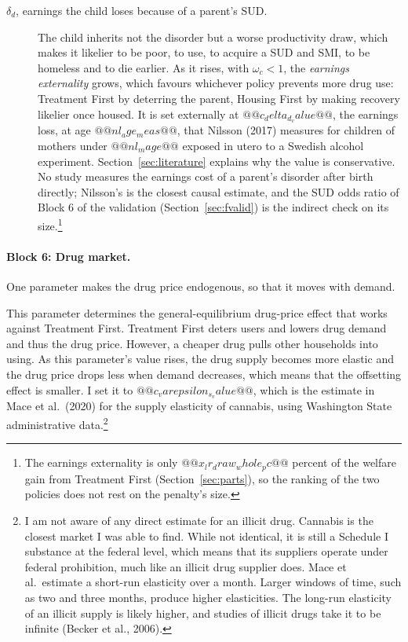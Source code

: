 \documentclass[10pt]{article}
\begin{document}
\begin{description}
\item[$\delta_d$, earnings the child loses because of a parent's SUD.] The child inherits not the disorder but a worse productivity draw, which makes it likelier to be poor, to use, to acquire a SUD and SMI, to be homeless and to die earlier. As it rises, with $\omega_c<1$, the \emph{earnings externality} grows, which favours whichever policy prevents more drug use: Treatment First by deterring the parent, Housing First by making recovery likelier once housed. It is set externally at $@@c_delta_d_value@@$, the earnings loss, at age $@@nl_age_meas@@$, that Nilsson (2017) measures for children of mothers under $@@nl_mage@@$ exposed in utero to a Swedish alcohol experiment. Section~\ref{sec:literature} explains why the value is conservative. No study measures the earnings cost of a parent's disorder after birth directly; Nilsson's is the closest causal estimate, and the SUD odds ratio of Block 6 of the validation (Section~\ref{sec:fvalid}) is the indirect check on its size.\footnote{The earnings externality is only $@@x_lr_draw_whole_pc@@$ percent of the welfare gain from Treatment First (Section~\ref{sec:parts}), so the ranking of the two policies does not rest on the penalty's size.}
\end{description}

\paragraph{Block 6: Drug market.} One parameter makes the drug price endogenous, so that it moves with demand.
\begin{description}\setlength{\itemsep}{0.25em}\setlength{\parskip}{0em}
\item[$\varepsilon_s$, the price elasticity of drug supply.]   This parameter determines the general-equilibrium drug-price effect that works against Treatment First. Treatment First deters users and lowers drug demand and thus the drug price. However, a cheaper drug pulls other households into using. As this parameter's value rises, the drug supply becomes more elastic and the drug price drops less when demand decreases, which means that the offsetting effect is smaller. I set it to $@@c_varepsilon_s_value@@$, which is the estimate in Mace et al.\ (2020) for the supply elasticity of cannabis, using Washington State administrative data.\footnote{  I am not aware of any direct estimate for an illicit drug. Cannabis is the closest market I was able to find. While not identical, it is still a Schedule I substance at the federal level, which means that its suppliers operate under federal prohibition, much like an illicit drug supplier does. Mace et al.\ estimate a short-run elasticity over a month. Larger windows of time, such as two and three months, produce higher elasticities. The long-run elasticity of an illicit supply is likely higher, and studies of illicit drugs take it to be infinite (Becker et al., 2006).}
\end{description}
\end{document}
